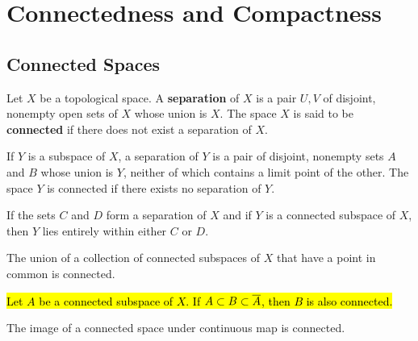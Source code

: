 \newpage
\setcounter{section}{2}
\section{Connectedness and Compactness}

\subsection{Connected Spaces}\nl
\setcounter{section}{23}
\setcounter{thm}{0}

\vs

\dfn Let $X$ be a topological space. A \textbf{separation} of $X$ is a pair $U, V$ of disjoint, nonempty open sets of $X$ whose union is $X$. The space $X$ is said to be \textbf{connected} if there does not exist a separation of $X$.

\vs

\begin{lem}
If $Y$ is a subspace of $X$, a separation of $Y$ is a pair of disjoint, nonempty sets $A$ and $B$ whose union is $Y$, neither of which contains a limit point of the other. The space $Y$ is connected if there exists no separation of $Y$.
\end{lem}

\vs

\begin{lem}
If the sets $C$ and $D$ form a separation of $X$ and if $Y$ is a connected subspace of $X$, then $Y$ lies entirely within either $C$ or $D$.
\end{lem}

\vs

\begin{thm}
The union of a collection of connected subspaces of $X$ that have a point in common is connected.
\end{thm}

\vs

\begin{thm}
\hl{Let $A$ be a connected subspace of $X$. If $A\subset B\subset \overline A$, then $B$ is also connected.}
\end{thm}

\vs

\begin{thm}
The image of a connected space under continuous map is connected.
\end{thm}

